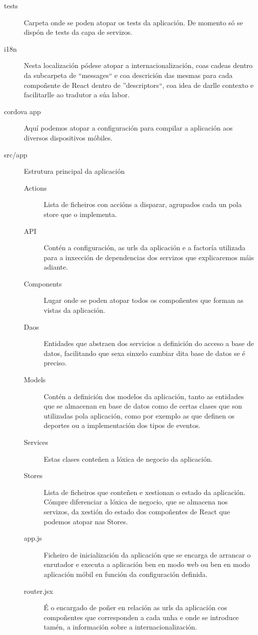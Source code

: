       \begin{description}
        \item [tests] Carpeta onde se poden atopar os tests da aplicación. De 
momento só se dispón de tests da capa de servizos.
        \item [i18n] Nesta localización pódese atopar a internacionalización, 
coas cadeas dentro da subcarpeta de ``messages`` e coa descrición das mesmas 
para cada compoñente de React dentro de ''descriptors``, coa idea de darlle 
contexto e facilitarlle ao tradutor a súa labor.
        \item [cordova app] Aquí podemos atopar a configuración para compilar a 
aplicación aos diversos dispositivos móbiles.
        \item [src/app] Estrutura principal da aplicación
        \begin{description}
          \item [Actions] Lista de ficheiros con accións a disparar, agrupados 
cada un pola store que o implementa.
          \item [API] Contén a configuración, as urls da aplicación e a 
factoría utilizada para a inxección de dependencias dos servizos que 
explicaremos máis adiante.
          \item [Components] Lugar onde se poden atopar todos os compoñentes 
que forman as vistas da aplicación. 
          \item [Daos] Entidades que abstraen dos servicios a definición do 
acceso a base de datos, facilitando que sexa sinxelo cambiar dita base de datos 
se é preciso.
          \item [Models] Contén a definición dos modelos da aplicación, tanto as 
entidades que se almacenan en base de datos como de certas clases que son 
utilizadas pola aplicación, como por exemplo as que definen os deportes ou a 
implementación dos tipos de eventos.
          \item [Services] Estas clases conteñen a lóxica de negocio da 
aplicación.
          \item [Stores] Lista de ficheiros que conteñen e xestionan o estado da 
aplicación. Cómpre diferenciar a lóxica de negocio, que se almacena nos 
servizos, da xestión do estado dos compoñentes de React que podemos atopar nas 
Stores.
          \item [app.js] Ficheiro de inicialización da aplicación que se encarga 
de arrancar o enrutador e executa a aplicación ben en modo web ou ben en modo 
aplicación móbil en función da configuración definida.
          \item [router.jsx] É o encargado de poñer en relación as urls da 
aplicación cos compoñentes que corresponden a cada unha e onde se introduce 
tamén, a información sobre a internacionalización.

        \end{description}

      \end{description}


